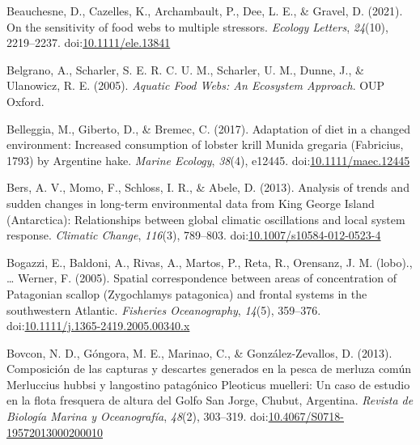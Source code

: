 \documentclass[
]{article}
\newlength{\cslhangindent}
\newlength{\cslentryspacingunit} %
\newenvironment{CSLReferences}[2] %
 {%
  \setlength{\parindent}{0pt}
  \ifodd #1
  \let\oldpar\par
  \def\par{\hangindent=\cslhangindent\oldpar}
  \fi
  \setlength{\parskip}{#2\cslentryspacingunit}
 }%
 {}
\begin{document}
\begin{CSLReferences}{1}{0}
\leavevmode{}%
Beauchesne, D., Cazelles, K., Archambault, P., Dee, L. E., \& Gravel, D.
(2021). On the sensitivity of food webs to multiple stressors.
\emph{Ecology Letters}, \emph{24}(10), 2219--2237.
doi:\href{https://doi.org/10.1111/ele.13841}{10.1111/ele.13841}

\leavevmode{}%
Belgrano, A., Scharler, S. E. R. C. U. M., Scharler, U. M., Dunne, J.,
\& Ulanowicz, R. E. (2005). \emph{Aquatic {Food Webs}: {An Ecosystem
Approach}}. {OUP Oxford}.

\leavevmode{}%
Belleggia, M., Giberto, D., \& Bremec, C. (2017). Adaptation of diet in
a changed environment: {Increased} consumption of lobster krill {Munida}
gregaria ({Fabricius}, 1793) by {Argentine} hake. \emph{Marine Ecology},
\emph{38}(4), e12445.
doi:\href{https://doi.org/10.1111/maec.12445}{10.1111/maec.12445}

\leavevmode{}%
Bers, A. V., Momo, F., Schloss, I. R., \& Abele, D. (2013). Analysis of
trends and sudden changes in long-term environmental data from {King
George Island} ({Antarctica}): Relationships between global climatic
oscillations and local system response. \emph{Climatic Change},
\emph{116}(3), 789--803.
doi:\href{https://doi.org/10.1007/s10584-012-0523-4}{10.1007/s10584-012-0523-4}

\leavevmode{}%
Bogazzi, E., Baldoni, A., Rivas, A., Martos, P., Reta, R., Orensanz, J.
M. (lobo)., \ldots{} Werner, F. (2005). Spatial correspondence between
areas of concentration of {Patagonian} scallop ({Zygochlamys}
patagonica) and frontal systems in the southwestern {Atlantic}.
\emph{Fisheries Oceanography}, \emph{14}(5), 359--376.
doi:\href{https://doi.org/10.1111/j.1365-2419.2005.00340.x}{10.1111/j.1365-2419.2005.00340.x}

\leavevmode{}%
Bovcon, N. D., Góngora, M. E., Marinao, C., \& González-Zevallos, D.
(2013). Composición de las capturas y descartes generados en la pesca de
merluza común {Merluccius} hubbsi y langostino patagónico {Pleoticus}
muelleri: Un caso de estudio en la flota fresquera de altura del {Golfo
San Jorge}, {Chubut}, {Argentina}. \emph{Revista de Biología Marina y
Oceanografía}, \emph{48}(2), 303--319.
doi:\href{https://doi.org/10.4067/S0718-19572013000200010}{10.4067/S0718-19572013000200010}


\end{CSLReferences}
\end{document}
